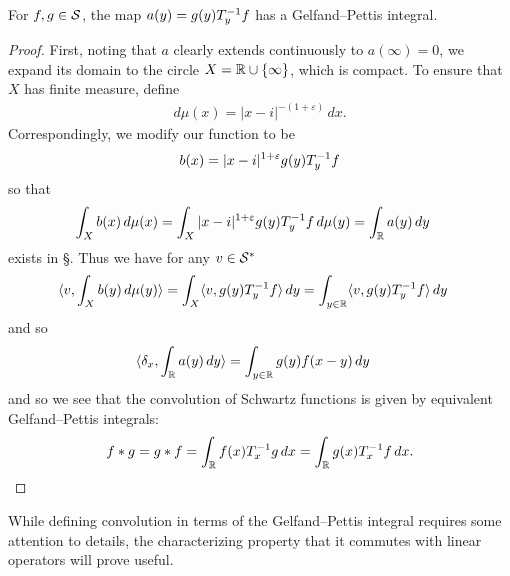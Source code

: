     \begin{claim}
      \label{claim:GPconv}
      For $f,g\in\S$, the map $a(y)=g(y)T_y\inv f$ has a Gelfand--Pettis integral.
    \end{claim}
    \begin{proof}
      First, noting that $a$ clearly extends continuously to $a(\infty)=0$, we expand its domain to the circle $X=\R\cup\{\infty\}$, which is compact.
      To ensure that $X$ has finite measure, define
      \begin{align*}
        d\mu(x) = |x-i|^{-(1+\varepsilon)}\,dx \text{.}
      \end{align*}
      Correspondingly, we modify our function to be
      \begin{align*}
        b(x) = |x-i|^{1+\varepsilon} g(y)T_y\inv f
      \end{align*}
      so that
      \begin{align*}
        \int_X b(x)\,d\mu(x)
        &= \int_{X} |x-i|^{1+\varepsilon} g(y)T_y\inv f\,d\mu(y)
        = \int_{\R} a(y)\,dy
      \end{align*}
      exists in \S.
      Thus we have for any $v\in\SS$
      \begin{align*}
        \langle v, \int_X b(y)\,d\mu(y) \rangle
        &= \int_X \langle v, g(y)T_y\inv f\rangle\, dy
        = \int_{y\in\R} \langle v, g(y)T_y\inv f\rangle\, dy
      \end{align*}
      and so
      \begin{align*}
        \langle \delta_x, \int_{\R} a(y)\,dy \rangle
        &= \int_{y\in\R} g(y)f(x-y)\,dy
      \end{align*}
      and so we see that the convolution of Schwartz functions is given by equivalent Gelfand--Pettis integrals:
      \begin{align*}
        f*g = g*f = \int_\R f(x)T_x\inv g\,dx = \int_\R g(x)T_x\inv f\,dx \text{.}
      \end{align*}
    \end{proof}

    While defining convolution in terms of the Gelfand--Pettis integral requires some attention to details, the characterizing property that it commutes with linear operators will prove useful.

